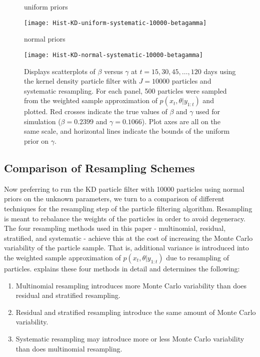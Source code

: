 \documentclass{elsarticle}
\begin{document}
\begin{figure}
\centering
\begin{minipage}{1.0\linewidth}
\caption*{uniform priors}
\texttt{[image: Hist-KD-uniform-systematic-10000-betagamma]}
\end{minipage}
\begin{minipage}{1.0\linewidth}
\caption*{normal priors}
\texttt{[image: Hist-KD-normal-systematic-10000-betagamma]}
\end{minipage}
\caption{Displays scatterplots of $\beta$ versus $\gamma$ at $t = 15, 30, 45,\ldots,120$ days using the kernel density particle filter with $J = 10000$ particles and systematic resampling.  For each panel, 500 particles were sampled from the weighted sample approximation of $p(x_t,\theta|y_{1:t})$ and plotted.  Red crosses indicate the true values of $\beta$ and $\gamma$ used for simulation ($\beta = 0.2399$ and $\gamma = 0.1066$).  Plot axes are all on the same scale, and horizontal lines indicate the bounds of the uniform prior on $\gamma$.} \label{fig:priors}
\end{figure}

\subsection{Comparison of Resampling Schemes}

Now preferring to run the KD particle filter with 10000 particles using normal priors on the unknown parameters, we turn to a comparison of different techniques for the resampling step of the particle filtering algorithm.  Resampling is meant to rebalance the weights of the particles in order to avoid degeneracy.  The four resampling methods used in this paper - multinomial, residual, stratified, and systematic - achieve this at the cost of increasing the Monte Carlo variability of the particle sample.  That is, additional variance is introduced into the weighted sample approximation of $p(x_t,\theta|y_{1:t})$ due to resampling of particles.  \citet{Douc:Capp:Moul:comp:2005} explains these four methods in detail and determines the following:
\begin{enumerate}
\item Multinomial resampling introduces more Monte Carlo variability than does residual and stratified resampling.
\item Residual and stratified resampling introduce the same amount of Monte Carlo variability.
\item Systematic resampling may introduce more or less Monte Carlo variability than does multinomial resampling.
\end{enumerate}
\end{document}
